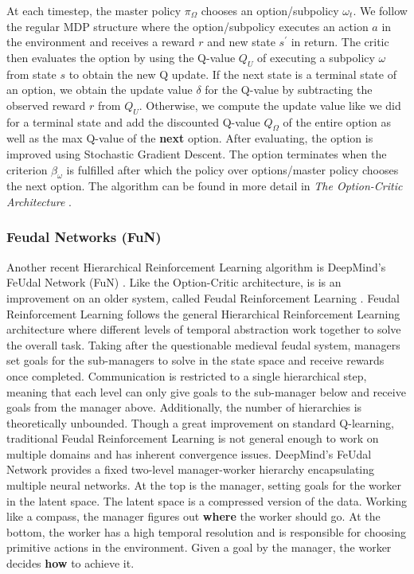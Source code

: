 \documentclass[notitlepage,a4paper,11pt]{article}
\begin{document}
At each timestep, the master policy $\pi_\Omega$ chooses an option/subpolicy $\omega_t$. We follow the regular MDP structure where the option/subpolicy executes an action $a$ in the environment and receives a reward $r$ and new state $s^\prime$ in return. The critic then evaluates the option by using the Q-value $Q_U$ of executing a subpolicy $\omega$ from state $s$ to obtain the new Q update. If the next state is a terminal state of an option, we obtain the update value $\delta$ for the Q-value by subtracting the observed reward $r$ from $Q_U$. Otherwise, we compute the update value like we did for a terminal state and add the discounted Q-value $Q_\Omega$ of the entire option as well as the max Q-value of the \textbf{next} option. After evaluating, the option is improved using Stochastic Gradient Descent. The option terminates when the criterion $\beta_\omega$ is fulfilled after which the policy over options/master policy chooses the next option. The algorithm can be found in more detail in \textit{The Option-Critic Architecture} \cite{bacon2017option}.

\subsubsection{Feudal Networks (FuN)}
Another recent Hierarchical Reinforcement Learning algorithm is DeepMind's FeUdal Network (FuN) \cite{vezhnevets2017feudal}. Like the Option-Critic architecture, is is an improvement on an older system, called Feudal Reinforcement Learning \cite{dayan1993feudal}. Feudal Reinforcement Learning follows the general Hierarchical Reinforcement Learning architecture where different levels of temporal abstraction work together to solve the overall task. Taking after the questionable medieval feudal system, managers set goals for the sub-managers to solve in the state space and receive rewards once completed. Communication is restricted to a single hierarchical step, meaning that each level can only give goals to the sub-manager below and receive goals from the manager above. Additionally, the number of hierarchies is theoretically unbounded. Though a great improvement on standard Q-learning, traditional Feudal Reinforcement Learning is not general enough to work on multiple domains and has inherent convergence issues. DeepMind's FeUdal Network provides a fixed two-level manager-worker hierarchy encapsulating multiple neural networks. At the top is the manager, setting goals for the worker in the latent space. The latent space is a compressed version of the data. Working like a compass, the manager figures out \textbf{where} the worker should go. At the bottom, the worker has a high temporal resolution and is responsible for choosing primitive actions in the environment. Given a goal by the manager, the worker decides \textbf{how} to achieve it.
\end{document}
